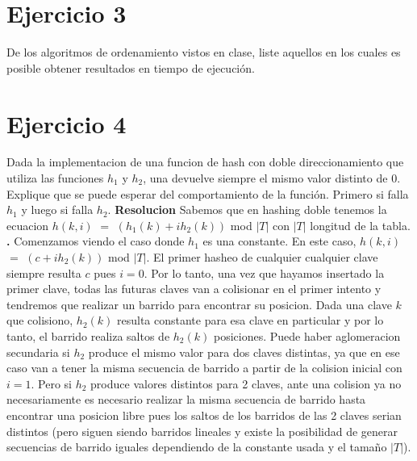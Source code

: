 \documentclass[10pt,a4paper]{article}
\begin{document}
\newpage

\section{Ejercicio 3}

De los algoritmos de ordenamiento vistos en clase, liste aquellos en los cuales es posible obtener resultados en tiempo de ejecución.
\newpage

\section{Ejercicio 4}

Dada la implementacion de una funcion de hash con doble direccionamiento que utiliza las funciones $h_{1}$ y $h_{2}$, una devuelve siempre el mismo valor distinto de 0. Explique que se puede esperar del comportamiento de la función. Primero si falla $h_{1}$ y luego si falla $h_{2}$.
\newline 
\newline
\textbf{Resolucion}
\newline 
\newline
Sabemos que en hashing doble tenemos la ecuacion $h(k,i)$ $=$ $(h_{1}(k) + ih_{2}(k))$ mod $|T|$ con $|T|$ longitud de la tabla.  
\newline 
\newline
\textbf{.} Comenzamos viendo el caso donde $h_{1}$ es una constante.
\newline 
\newline
En este caso, $h(k,i)$ $=$ $(c + ih_{2}(k))$ mod $|T|$.
\newline 
\newline
El primer hasheo de cualquier cualquier clave siempre resulta $c$ pues $i = 0$. Por lo tanto, una vez que hayamos insertado la primer clave, todas las futuras claves van a colisionar en el primer intento y tendremos que realizar un barrido para encontrar su posicion. Dada una clave $k$ que colisiono, $h_{2}(k)$ resulta constante para esa clave en particular y por lo tanto, el barrido realiza saltos de $h_{2}(k)$ posiciones.
\newline 
\newline
Puede haber aglomeracion secundaria si $h_{2}$ produce el mismo valor para dos claves distintas, ya que en ese caso van a tener la misma secuencia de barrido a partir de la colision inicial con $i = 1$. Pero si $h_{2}$ produce valores distintos para 2 claves, ante una colision ya no necesariamente es necesario realizar la misma secuencia de barrido hasta encontrar una posicion libre pues los saltos de los barridos de las 2 claves serian distintos (pero siguen siendo barridos lineales y existe la posibilidad de generar secuencias de barrido iguales dependiendo de la constante usada y el tamaño $|T|$).  
\end{document}

